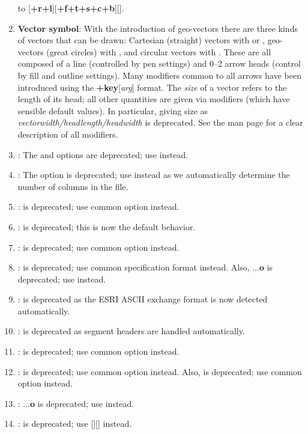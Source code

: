 \begin{enumerate}
		to [{\bf +r+l}][{\bf +f+t+s+c+b}][].
	\item {\bf Vector symbol}: With the introduction of geo-vectors there are three kinds of vectors that can be drawn:
		Cartesian (straight) vectors with  or , geo-vectors (great circles) with , and circular vectors with .
		These are all composed of a line (controlled by pen settings) and 0--2 arrow heads (control by fill and outline settings).
		Many modifiers common to all arrows have been introduced using the {\bf +key}[{\it arg}] format.  The {\it size}
		of a vector refers to the length of its head; all other quantities are given via modifiers (which have sensible default values).
		In particular, giving size as {\it vectorwidth/headlength/headwidth} is deprecated.
		See the  man page for a clear description of all modifiers.
	\item {}: The  and  options are deprecated; use  instead.
	\item {}: The  option is deprecated; use  instead
		as we automatically determine the number of columns in the file.
	\item {}:  is deprecated; use common option  instead.
	\item {}:  is deprecated; this is now the default behavior.
	\item {}:  is deprecated; use common option  instead.
	\item {}:  is deprecated; use common specification format  instead. Also,
		...{\bf o} is deprecated; use  instead.
	\item {}:  is deprecated as the ESRI ASCII exchange format is now detected automatically.
	\item {}:  is deprecated as segment headers are handled automatically.
	\item {}:  is deprecated; use common option  instead.
	\item {}:  is deprecated; use common option  instead.  Also,
		 is deprecated; use common option  instead.
	\item {}: ...{\bf o} is deprecated; use  instead.
	\item {}:  is deprecated; use [][] instead.

\end{enumerate}
